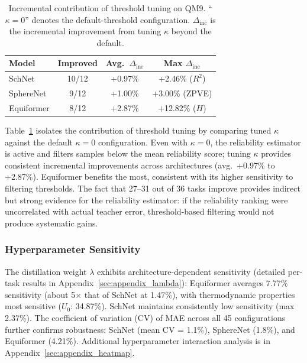 \begin{table}[!t]
  \scriptsize
  \centering
  \caption{Incremental contribution of threshold tuning on QM9. ``$\kappa\!=\!0$'' denotes the default-threshold configuration. $\Delta_{\text{inc}}$ is the incremental improvement from tuning $\kappa$ beyond the default.}
  \label{tab:incremental}
    \begin{tabular}{lccc}
    \toprule
    \textbf{Model} & \textbf{Improved} & \textbf{Avg.\ $\Delta_{\text{inc}}$} & \textbf{Max $\Delta_{\text{inc}}$} \\
    \midrule
    SchNet & 10/12 & +0.97\% & +2.46\% ($R^2$) \\
    SphereNet & 9/12 & +1.00\% & +3.00\% (ZPVE) \\
    Equiformer & 8/12 & +2.87\% & +12.82\% ($H$) \\
    \bottomrule
    \end{tabular}
\end{table}

Table~\ref{tab:incremental} isolates the contribution of threshold tuning by comparing tuned $\kappa$ against the default $\kappa{=}0$ configuration. Even with $\kappa=0$, the reliability estimator is active and filters samples below the mean reliability score; tuning $\kappa$ provides consistent incremental improvements across architectures (avg.\ +0.97\% to +2.87\%). Equiformer benefits the most, consistent with its higher sensitivity to filtering thresholds. %
The fact that 27--31 out of 36 tasks improve provides indirect but strong evidence for the reliability estimator: if the reliability ranking were uncorrelated with actual teacher error, threshold-based filtering would not produce systematic gains.

\subsubsection{Hyperparameter Sensitivity}
\label{sec:model_robustness}

The distillation weight $\lambda$ exhibits architecture-dependent sensitivity (detailed per-task results in Appendix~\ref{sec:appendix_lambda}): Equiformer averages 7.77\% sensitivity (about 5$\times$ that of SchNet at 1.47\%), with thermodynamic properties most sensitive ($U_0$: 34.87\%). SchNet maintains consistently low sensitivity (max 2.37\%). The coefficient of variation (CV) of MAE across all 45 configurations further confirms robustness: SchNet (mean CV = 1.1\%), SphereNet (1.8\%), and Equiformer (4.21\%). Additional hyperparameter interaction analysis is in Appendix~\ref{sec:appendix_heatmap}.

